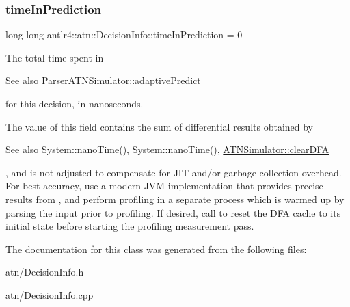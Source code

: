 \mbox{\label{classantlr4_1_1atn_1_1DecisionInfo_ae758fc847ab20067a1136393a0ae49c3}} 
\subsubsection{\texorpdfstring{time\+In\+Prediction}{timeInPrediction}}
{\footnotesize\ttfamily long long antlr4\+::atn\+::\+Decision\+Info\+::time\+In\+Prediction = 0}



The total time spent in \begin{DoxySeeAlso}{See also}
Parser\+A\+T\+N\+Simulator\+::adaptive\+Predict


\end{DoxySeeAlso}
for this decision, in nanoseconds. 

The value of this field contains the sum of differential results obtained by \begin{DoxySeeAlso}{See also}
System\+::nano\+Time(), System\+::nano\+Time(), \hyperlink{classantlr4_1_1atn_1_1ATNSimulator_a3358fa3e8ebcb4abeeceb914b0b07f10}{A\+T\+N\+Simulator\+::clear\+D\+FA}


\end{DoxySeeAlso}
, and is not adjusted to compensate for J\+IT and/or garbage collection overhead. For best accuracy, use a modern J\+VM implementation that provides precise results from , and perform profiling in a separate process which is warmed up by parsing the input prior to profiling. If desired, call  to reset the D\+FA cache to its initial state before starting the profiling measurement pass.

The documentation for this class was generated from the following files\+:\begin{DoxyCompactItemize}
\item 
atn/Decision\+Info.\+h\item 
atn/Decision\+Info.\+cpp\end{DoxyCompactItemize}
